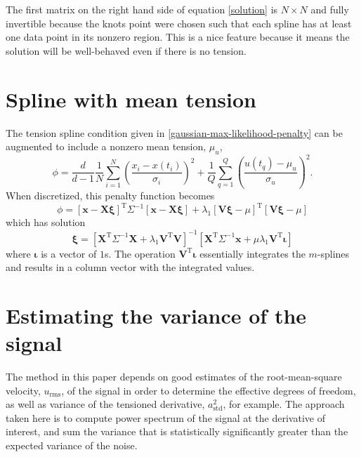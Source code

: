 \documentclass[10pt,journal]{IEEEtran}
\begin{document}
The first matrix on the right hand side of equation \ref{solution} is $N\times N$ and fully invertible because the knots point were chosen such that each spline has at least one data point in its nonzero region. This is a nice feature because it means the solution will be well-behaved even if there is no tension.

\section{Spline with mean tension}
\label{mean_tension}

The tension spline condition given in \ref{gaussian-max-likelihood-penalty} can be augmented to include a nonzero mean tension, $\mu_u$,
\begin{equation}
\phi =  \frac{d}{d-1} \frac{1}{N} \sum^N _{i=1}\left( \frac{x_i - x(t_i)}{\sigma_i} \right)^2 + \frac{1}{Q} \sum^{Q}_{q=1}  \left(  \frac{u(t_q)-\mu_u}{\sigma_u} \right)^2.
\end{equation}
When discretized, this penalty function becomes
\begin{equation}
\phi = \left[ \mathbf{x} - \mathbf{X} \mathbf{\xi} \right]^{\textrm{T}} \Sigma^{-1} \left[ \mathbf{x} - \mathbf{X} \mathbf{\xi}\right]
+ \lambda_1 \left[\mathbf{V}\mathbf{\xi} - \mu \right]^{\textrm{T}} \left[ \mathbf{V}\mathbf{\xi} - \mu \right]
\end{equation}
which has solution
\begin{equation}
\mathbf{\xi} = \left[ \mathbf{X}^{\textrm{T}} \Sigma^{-1} \mathbf{X} + \lambda_1 \mathbf{V}^{\textrm{T}} \mathbf{V} \right]^{-1}   \left[ \mathbf{X}^{\textrm{T}} \Sigma^{-1} \mathbf{x} +  \mu \lambda_1 \mathbf{V}^{\textrm{T}} \mathbf{\iota} \right]
\end{equation}
where $\mathbf{\iota}$ is a vector of $1$s. The operation $\mathbf{V}^{\textrm{T}} \mathbf{\iota}$ essentially integrates the $m$-splines and results in a column vector with the integrated values.


\section{Estimating the variance of the signal}
\label{variance_estimate}

The method in this paper depends on good estimates of the root-mean-square velocity, $u_{\textrm{rms}}$, of the signal in order to determine the effective degrees of freedom, as well as variance of the tensioned derivative, $a_{\textrm{std}}^2$, for example. The approach taken here is to compute power spectrum of the signal at the derivative of interest, and sum the variance that is statistically significantly greater than the expected variance of the noise.
\end{document}
